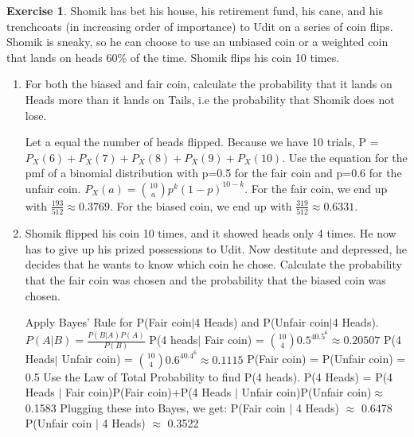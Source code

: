 \documentclass[12pt]{amsart}
\theoremstyle{definition}
\newtheorem{exercise}{Exercise}
\numberwithin{equation}{section}
\theoremstyle{plain}
\begin{document}
\begin{exercise}

    Shomik has bet his house, his retirement fund, his cane, and his trenchcoats (in increasing order of importance) to Udit on a series of coin flips. Shomik is sneaky, so he can choose to use an unbiased coin or a weighted coin that lands on heads 60$\%$ of the time. Shomik flips his coin 10 times. 
    \begin{enumerate}[label=\Alph*.]
\item For both the biased and fair coin, calculate the probability that it lands on Heads more than it lands on Tails, i.e the probability that Shomik does not lose. 
    \begin{answer}
    Let a equal the number of heads flipped. Because we have 10 trials, 
    \newline
    P = $P_X(6) + P_X(7) + P_X(8) + P_X(9) + P_X(10)$.
    \newline
    Use the equation for the pmf of a binomial distribution with p=0.5 for the fair coin and p=0.6 for the unfair coin.
    \newline
    $P_X(a)=\binom{10}{a}p^k(1-p)^{10-k}$. 
    \newline
    For the fair coin, we end up with $\frac{193}{512}\approx 0.3769$. 
    \newline
    For the biased coin, we end up with $\frac{319}{512} \approx 0.6331$.
    \end{answer}
    \item Shomik flipped his coin 10 times, and it showed heads only 4 times. He now has to give up his prized possessions to Udit. Now destitute and depressed, he decides that he wants to know which coin he chose. Calculate the probability that the fair coin was chosen and the probability that the biased coin was chosen.
    \begin{answer}
    Apply Bayes' Rule for P(Fair coin$ | $4 Heads) and P(Unfair coin$ | $4 Heads).
    \newline
    \newline
    $P(A|B)=\frac{P(B|A)P(A)}{P(B)}$
    \newline
    P(4 heads$ | $ Fair coin) = $\binom{10}{4}0.5^40.5^6\approx0.20507$
    \newline
     P(4 Heads$ | $ Unfair coin) = $\binom{10}{4}0.6^40.4^6\approx0.1115$
    \newline
    P(Fair coin) = P(Unfair coin) = 0.5
    \newline
    \newline
    Use the Law of Total Probability to find P(4 heads).
    \newline
    P(4 Heads) = P(4 Heads $|$ Fair coin)P(Fair coin)+P(4 Heads $|$ Unfair coin)P(Unfair coin)$\approx$0.1583
    \newline
    \newline
    Plugging these into Bayes, we get:
    \newline
    P(Fair coin $|$ 4 Heads) $\approx$ 0.6478
    \newline
    P(Unfair coin $|$ 4 Heads) $\approx$ 0.3522
    \end{answer}
\end{enumerate}
\end{exercise}
\end{document}
